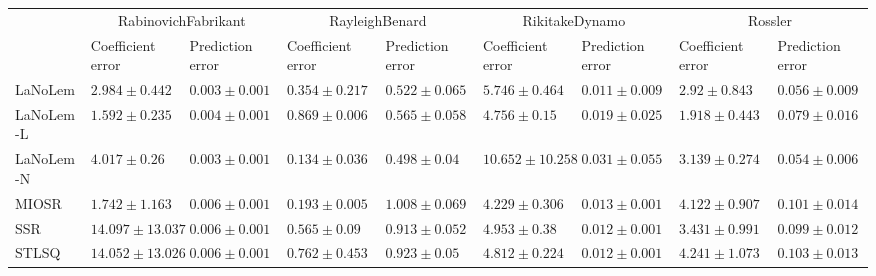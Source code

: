 \begin{table*}
{\begin{tabular}{lllllllll}
 & \multicolumn{2}{c}{RabinovichFabrikant} & \multicolumn{2}{c}{RayleighBenard} & \multicolumn{2}{c}{RikitakeDynamo} & \multicolumn{2}{c}{Rossler} \\
 & Coefficient error & Prediction error & Coefficient error & Prediction error & Coefficient error & Prediction error & Coefficient error & Prediction error \\
\midrule
LaNoLem & $2.984\pm 0.442$ & $0.003\pm 0.001$ & $0.354\pm 0.217$ & $0.522\pm 0.065$ & $5.746\pm 0.464$ & $\mathbf{0.011}\pm 0.009$ & $2.92\pm 0.843$ & $0.056\pm 0.009$ \\
LaNoLem-L & $\mathbf{1.592}\pm 0.235$ & $0.004\pm 0.001$ & $0.869\pm 0.006$ & $0.565\pm 0.058$ & $4.756\pm 0.15$ & $0.019\pm 0.025$ & $\mathbf{1.918}\pm 0.443$ & $0.079\pm 0.016$ \\
LaNoLem-N & $4.017\pm 0.26$ & $\mathbf{0.003}\pm 0.001$ & $\mathbf{0.134}\pm 0.036$ & $\mathbf{0.498}\pm 0.04$ & $10.652\pm 10.258$ & $0.031\pm 0.055$ & $3.139\pm 0.274$ & $\mathbf{0.054}\pm 0.006$ \\
MIOSR & $1.742\pm 1.163$ & $0.006\pm 0.001$ & $0.193\pm 0.005$ & $1.008\pm 0.069$ & $\mathbf{4.229}\pm 0.306$ & $0.013\pm 0.001$ & $4.122\pm 0.907$ & $0.101\pm 0.014$ \\
SSR & $14.097\pm 13.037$ & $0.006\pm 0.001$ & $0.565\pm 0.09$ & $0.913\pm 0.052$ & $4.953\pm 0.38$ & $0.012\pm 0.001$ & $3.431\pm 0.991$ & $0.099\pm 0.012$ \\
STLSQ & $14.052\pm 13.026$ & $0.006\pm 0.001$ & $0.762\pm 0.453$ & $0.923\pm 0.05$ & $4.812\pm 0.224$ & $0.012\pm 0.001$ & $4.241\pm 1.073$ & $0.103\pm 0.013$ \\

\midrule


\end{tabular}}
\end{table*}
